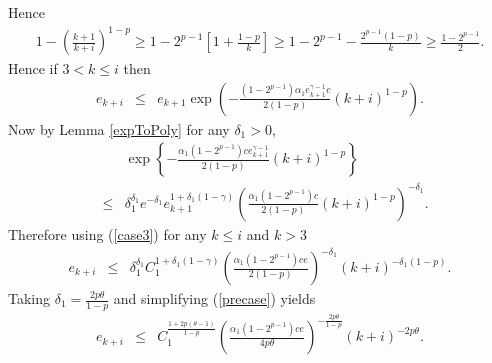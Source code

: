 Hence
\begin{eqnarray*}
1-\left(\frac{k+1}{k+i}\right)^{1-p}
\geq 
1-2^{p-1}\left[1+\frac{1-p}{k}\right]
\geq
1-2^{p-1}-\frac{2^{p-1}(1-p)}{k}
\geq 
 \frac{1-2^{p-1}}{2}.
\end{eqnarray*}
Hence if $3< k\leq i$ then 
\begin{eqnarray}
e_{k+i}&\leq& e_{k+1}\exp\left(
-\frac{(1-2^{p-1})\alpha_1  e_{k+1}^{\gamma-1} c}{2(1-p)}(k+i)^{1-p}
\right).
\end{eqnarray}
Now by Lemma \ref{expToPoly} for any $\delta_1>0$,
\begin{eqnarray*}
&&\exp\left\{-\frac{\alpha_1(1-2^{p-1})c e_{k+1}^{\gamma-1}}{2(1-p)}(k+i)^{1-p}\right\}
\\
&\leq&
\delta_1^{\delta_1}e^{-\delta_1} e_{k+1}^{1+\delta_1(1-\gamma)}
\left(
\frac{\alpha_1(1-2^{p-1})c}{2(1-p)}(k+i)^{1-p}
\right)^{-\delta_1}.
\end{eqnarray*}
Therefore using (\ref{case3}) for any $k\leq i$ and $k>3$ 
\begin{eqnarray}
e_{k+i}&\leq& 
\delta_1^{\delta_1}
C_1^{1+\delta_1(1-\gamma)}
\left(\frac{\alpha_1(1-2^{p-1}) c e }{2(1-p)}\right)^{-\delta_1}
(k+i)^{-\delta_1(1-p)}.
\label{precase}
\end{eqnarray}
Taking $\delta_1=\frac{2 p\theta}{1-p}$ and simplifying (\ref{precase}) yields
\begin{eqnarray}
\label{somecase}
e_{k+i}&\leq& 
C_1^{\frac{1+2p(\theta-1)}{1-p}}
\left(
\frac{\alpha_1(1-2^{p-1}) c e}{4p\theta}
\right)^{-\frac{2 p\theta}{1-p}}
(k+i)^{-2 p\theta}.
\end{eqnarray}



